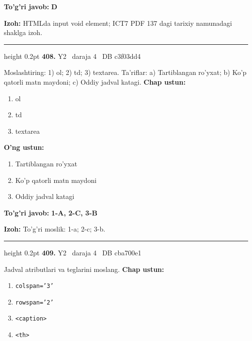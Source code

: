 \documentclass[10pt,a4paper,oneside]{article}
\begin{document}
\begin{tcolorbox}[enhanced,breakable,colback=teal!4,colframe=teal!45!black,boxrule=0.45pt,arc=1.2mm,left=2.8mm,right=2.8mm,top=2mm,bottom=2mm,before skip=2mm,after skip=2mm]
\textbf{\color{teal}To'g'ri javob:} \textbf{D}
\par\smallskip
\textbf{Izoh:} HTMLda input void element; ICT7 PDF 137 dagi tarixiy namunadagi shaklga izoh.
\end{tcolorbox}
\vspace{2mm}\hrule height 0.2pt \vspace{4mm}
\hypertarget{q408}{\textbf{\color{ink}408.}}  {\color{muted}\scriptsize Y2 \textbullet\ daraja 4 \textbullet\ DB c3f03dd4}
\par
Moslashtiring: 1) ol; 2) td; 3) textarea. Ta'riflar: a) Tartiblangan ro'yxat; b) Ko'p qatorli matn maydoni; c) Oddiy jadval katagi.
\textbf{\footnotesize Chap ustun:}
\begin{enumerate}[label=\arabic*),leftmargin=9mm]
\item ol
\item td
\item textarea
\end{enumerate}
\textbf{\footnotesize O'ng ustun:}
\begin{enumerate}[label=\Alph*),leftmargin=9mm]
\item Tartiblangan ro'yxat
\item Ko'p qatorli matn maydoni
\item Oddiy jadval katagi
\end{enumerate}
\begin{tcolorbox}[enhanced,breakable,colback=teal!4,colframe=teal!45!black,boxrule=0.45pt,arc=1.2mm,left=2.8mm,right=2.8mm,top=2mm,bottom=2mm,before skip=2mm,after skip=2mm]
\textbf{\color{teal}To'g'ri javob:} \textbf{1-A, 2-C, 3-B}
\par\smallskip
\textbf{Izoh:} To'g'ri moslik: 1-a; 2-c; 3-b.
\end{tcolorbox}
\vspace{2mm}\hrule height 0.2pt \vspace{4mm}
\hypertarget{q409}{\textbf{\color{ink}409.}}  {\color{muted}\scriptsize Y2 \textbullet\ daraja 4 \textbullet\ DB cba700e1}
\par
Jadval atributlari va teglarini moslang.
\textbf{\footnotesize Chap ustun:}
\begin{enumerate}[label=\arabic*),leftmargin=9mm]
\item \texttt{colspan='3'}
\item \texttt{rowspan='2'}
\item \texttt{\textless{}caption\textgreater{}}
\item \texttt{\textless{}th\textgreater{}}
\end{enumerate}
\end{document}
